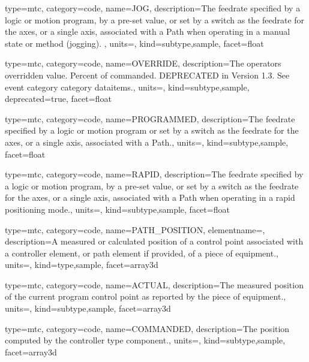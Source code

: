 {
  type=mtc,
  category=code,
  name={JOG},
  description={The feedrate specified by a logic or motion program, by a pre-set value, or set by a switch as the feedrate for the axes, or a single axis, associated with a Path when operating in a manual state or method (jogging).  },
  units=,
  kind={subtype,sample},
  facet={\gls{float}}
}


{
  type=mtc,
  category=code,
  name={OVERRIDE},
  description={The operators overridden value.  Percent of commanded. DEPRECATED in Version 1.3.   See \gls{event category} category \glspl{dataitem}.},
  units=,
  kind={subtype,sample},
  deprecated={true},
  facet={\gls{float}}
}


{
  type=mtc,
  category=code,
  name={PROGRAMMED},
  description={The feedrate specified by a logic or motion program or set by a switch as the feedrate for the axes, or a single axis, associated with a Path.},
  units=,
  kind={subtype,sample},
  facet={\gls{float}}
}


{
  type=mtc,
  category=code,
  name={RAPID},
  description={The feedrate specified by a logic or motion program, by a pre-set value, or set by a switch as the feedrate for the axes, or a single axis, associated with a Path when operating in a rapid positioning mode.},
  units=,
  kind={subtype,sample},
  facet={\gls{float}}
}


{
  type=mtc,
  category=code,
  name={PATH\_POSITION},
  elementname=,
  description={A measured or calculated position of a control point associated with a \gls{controller} element, or \gls{path} element if provided, of a piece of equipment.},
  units=,
  kind={type,sample},
  facet={\gls{array3d}}
}


{
  type=mtc,
  category=code,
  name={ACTUAL},
  description={The measured position of the current program control point as reported by the piece of equipment.},
  units=,
  kind={subtype,sample},
  facet={\gls{array3d}}
}


{
  type=mtc,
  category=code,
  name={COMMANDED},
  description={The position computed by the \gls{controller} type component.},
  units=,
  kind={subtype,sample},
  facet={\gls{array3d}}
}


